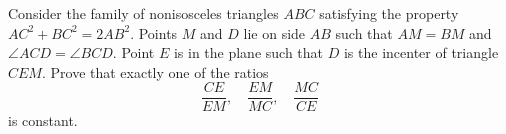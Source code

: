 Consider the family of  nonisosceles triangles $ABC$ satisfying the property $AC^2 + BC^2 = 2 AB^2$. Points $M$ and $D$ lie on side $AB$ such that $AM = BM$ and $\angle ACD = \angle BCD$. Point $E$ is in the plane such that $D$ is the incenter of triangle $CEM$. Prove that exactly one of the ratios \[ \frac{CE}{EM}, \quad \frac{EM}{MC}, \quad \frac{MC}{CE}  \] is constant.